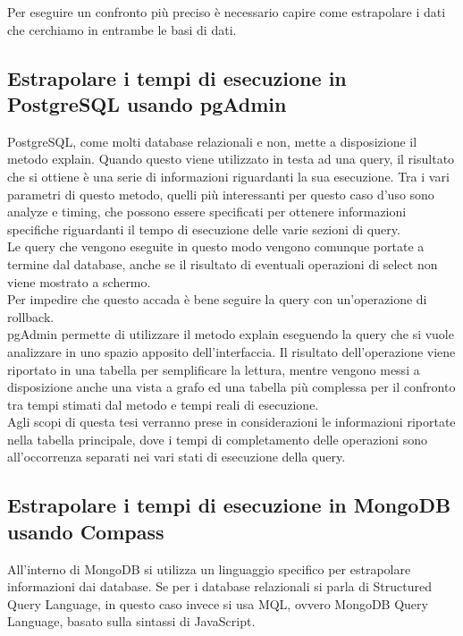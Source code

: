 Per eseguire un confronto più preciso è necessario capire come estrapolare i dati che cerchiamo in entrambe le basi di dati.

\subsection{Estrapolare i tempi di esecuzione in PostgreSQL usando pgAdmin}
PostgreSQL, come molti database relazionali e non, mette a disposizione il metodo explain. Quando questo viene utilizzato in testa ad una query, il risultato che si ottiene è una serie di informazioni riguardanti la sua esecuzione. Tra i vari parametri di questo metodo, quelli più interessanti per questo caso d'uso sono analyze e timing, che possono essere specificati per ottenere informazioni specifiche riguardanti il tempo di esecuzione delle varie sezioni di query.\\
Le query che vengono eseguite in questo modo vengono comunque portate a termine dal database, anche se il risultato di eventuali operazioni di select non viene mostrato a schermo.\\
Per impedire che questo accada è bene seguire la query con un'operazione di rollback.\\

\noindent pgAdmin permette di utilizzare il metodo explain eseguendo la query che si vuole analizzare in uno spazio apposito dell'interfaccia. Il risultato dell'operazione viene riportato in una tabella per semplificare la lettura, mentre vengono messi a disposizione anche una vista a grafo ed una tabella più complessa per il confronto tra tempi stimati dal metodo e tempi reali di esecuzione.\\
Agli scopi di questa tesi verranno prese in considerazioni le informazioni riportate nella tabella principale, dove i tempi di completamento delle operazioni sono all'occorrenza separati nei vari stati di esecuzione della query.

\subsection{Estrapolare i tempi di esecuzione in MongoDB usando Compass}
All'interno di MongoDB si utilizza un linguaggio specifico per estrapolare informazioni dai database. Se per i database relazionali si parla di Structured Query Language, in questo caso invece si usa MQL, ovvero MongoDB Query Language, basato sulla sintassi di JavaScript.\\

